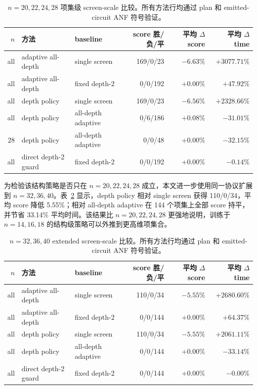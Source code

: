 \documentclass[UTF8,fontset=macnew,11pt]{ctexart}
\begin{document}
\begin{table}[H]
\centering
\scriptsize
\caption{$n=20,22,24,28$ 项集级 screen-scale 比较。所有方法行均通过 plan 和 emitted-circuit ANF 符号验证。}
\label{tab:scale}
\begin{tabular}{rllrrr}
\toprule
$n$ & 方法 & baseline & score 胜/负/平 & 平均 $\Delta$ score & 平均 $\Delta$ time \\
\midrule
all & adaptive all-depth & single screen & 169/0/23 & $-6.63\%$ & $+3077.71\%$ \\
all & adaptive all-depth & fixed depth-2 & 0/0/192 & $+0.00\%$ & $+47.92\%$ \\
all & depth policy & single screen & 169/0/23 & $-6.56\%$ & $+2328.66\%$ \\
all & depth policy & all-depth adaptive & 0/6/186 & $+0.08\%$ & $-31.01\%$ \\
28 & depth policy & all-depth adaptive & 0/0/48 & $+0.00\%$ & $-32.15\%$ \\
all & direct depth-2 guard & fixed depth-2 & 0/0/192 & $+0.00\%$ & $-0.14\%$ \\
\bottomrule
\end{tabular}
\end{table}

为检验该结构策略是否只在 $n=20,22,24,28$ 成立，本文进一步使用同一协议扩展到 $n=32,36,40$。表~\ref{tab:scale-extended} 显示，depth policy 相对 single screen 获得 110/0/34，平均 score 降低 5.55\%；相对 all-depth adaptive 在 144 个项集上全部 score 持平，并节省 33.14\% 平均时间。该结果比 $n=20,22,24,28$ 更强地说明，训练于 $n=14,16,18$ 的结构级策略可以外推到更高维项集合。

\begin{table}[H]
\centering
\scriptsize
\caption{$n=32,36,40$ extended screen-scale 比较。所有方法行均通过 plan 和 emitted-circuit ANF 符号验证。}
\label{tab:scale-extended}
\begin{tabular}{rllrrr}
\toprule
$n$ & 方法 & baseline & score 胜/负/平 & 平均 $\Delta$ score & 平均 $\Delta$ time \\
\midrule
all & adaptive all-depth & single screen & 110/0/34 & $-5.55\%$ & $+2680.60\%$ \\
all & adaptive all-depth & fixed depth-2 & 0/0/144 & $+0.00\%$ & $+64.37\%$ \\
all & depth policy & single screen & 110/0/34 & $-5.55\%$ & $+2061.11\%$ \\
all & depth policy & all-depth adaptive & 0/0/144 & $+0.00\%$ & $-33.14\%$ \\
all & direct depth-2 guard & fixed depth-2 & 0/0/144 & $+0.00\%$ & $-0.00\%$ \\
\bottomrule
\end{tabular}
\end{table}
\end{document}
